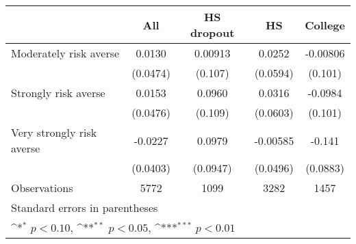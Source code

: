 {
\def\sym#1{\ifmmode^{#1}\else\(^{#1}\)\fi}
\begin{tabular}{l*{4}{c}}
\toprule
                    &\multicolumn{1}{c}{All}&\multicolumn{1}{c}{HS dropout}&\multicolumn{1}{c}{HS}&\multicolumn{1}{c}{College}\\
\midrule
Moderately risk averse&      0.0130         &     0.00913         &      0.0252         &    -0.00806         \\
                    &    (0.0474)         &     (0.107)         &    (0.0594)         &     (0.101)         \\
\addlinespace
Strongly risk averse&      0.0153         &      0.0960         &      0.0316         &     -0.0984         \\
                    &    (0.0476)         &     (0.109)         &    (0.0603)         &     (0.101)         \\
\addlinespace
Very strongly risk averse&     -0.0227         &      0.0979         &    -0.00585         &      -0.141         \\
                    &    (0.0403)         &    (0.0947)         &    (0.0496)         &    (0.0883)         \\
\midrule
Observations        &        5772         &        1099         &        3282         &        1457         \\
\bottomrule
\multicolumn{5}{l}{\footnotesize Standard errors in parentheses}\\
\multicolumn{5}{l}{\footnotesize \sym{*} \(p<0.10\), \sym{**} \(p<0.05\), \sym{***} \(p<0.01\)}\\
\end{tabular}
}
